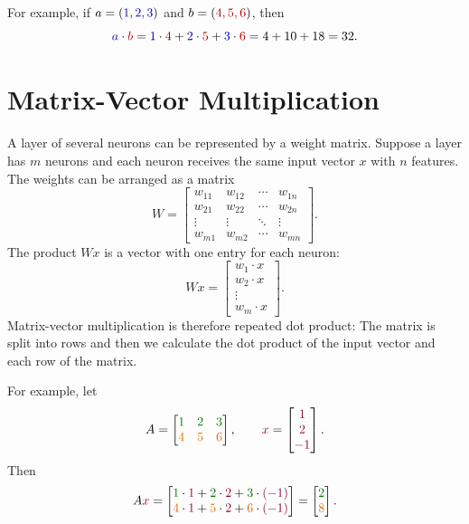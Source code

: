 \documentclass[11pt,openany,oneside]{book}
\newcommand{\avec}[1]{\textcolor{blue!70!black}{#1}}
\newcommand{\bvec}[1]{\textcolor{red!70!black}{#1}}
\newcommand{\rowone}[1]{\textcolor{green!45!black}{#1}}
\newcommand{\rowtwo}[1]{\textcolor{orange!85!black}{#1}}
\newcommand{\xvec}[1]{\textcolor{purple!75!black}{#1}}
\begin{document}
For example, if $a = (\avec{1,2,3})$ and $b = (\bvec{4,5,6})$, then
\[
    \avec{a} \cdot \bvec{b}
    = \avec{1} \cdot \bvec{4}
    + \avec{2} \cdot \bvec{5}
    + \avec{3} \cdot \bvec{6}
    = 4 + 10 + 18 = 32.
\]

\section{Matrix-Vector Multiplication}

A layer of several neurons can be represented by a weight matrix. Suppose a
layer has $m$ neurons and each neuron receives the same input vector $x$ with
$n$ features. The weights can be arranged as a matrix
\[
    W =
    \begin{bmatrix}
    w_{11} & w_{12} & \cdots & w_{1n} \\
    w_{21} & w_{22} & \cdots & w_{2n} \\
    \vdots & \vdots & \ddots & \vdots \\
    w_{m1} & w_{m2} & \cdots & w_{mn}
    \end{bmatrix}.
\]
The product $Wx$ is a vector with one entry for each neuron:
\[
    Wx =
    \begin{bmatrix}
    w_1 \cdot x \\
    w_2 \cdot x \\
    \vdots \\
    w_m \cdot x
    \end{bmatrix}.
\]
Matrix-vector multiplication is therefore repeated dot product: The matrix is split into rows and then we calculate the dot product of the input vector and each row of the matrix.

For example, let
\[
    A =
    \begin{bmatrix}
    \rowone{1} & \rowone{2} & \rowone{3} \\
    \rowtwo{4} & \rowtwo{5} & \rowtwo{6}
    \end{bmatrix},
    \qquad
    \xvec{x} =
    \begin{bmatrix}
    \xvec{1} \\ \xvec{2} \\ \xvec{-1}
    \end{bmatrix}.
\]
Then
\[
    A\xvec{x} =
    \begin{bmatrix}
    \rowone{1} \cdot \xvec{1}
    + \rowone{2} \cdot \xvec{2}
    + \rowone{3} \cdot \xvec{(-1)} \\
    \rowtwo{4} \cdot \xvec{1}
    + \rowtwo{5} \cdot \xvec{2}
    + \rowtwo{6} \cdot \xvec{(-1)}
    \end{bmatrix}
    =
    \begin{bmatrix}
    \rowone{2} \\ \rowtwo{8}
    \end{bmatrix}.
\]
\end{document}
